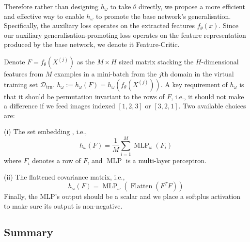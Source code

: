 \documentclass{article}
\newcommand{\modelname}{Feature-Critic}
\begin{document}
Therefore rather than designing $h_\omega$ to take $\theta$ directly, we propose a more efficient and effective way to enable $h_\omega$ to promote the base network's generalisation. Specifically, the auxiliary loss operates on the extracted features $f_\theta(x)$. Since our auxiliary generalisation-promoting loss operates on the feature representation produced by the base network, we denote it \modelname. 

Denote $F=f_\theta(X^{(j)})$ as the  $M\times H$ sized matrix stacking the $H$-dimensional features from $M$ examples in a mini-batch from the $j$th domain in the virtual training set  $\mathcal{D}_{\text{trn}}$. $h_\omega:=h_\omega(F)=h_\omega(f_\theta(X^{(j)}))$. A key requirement of $h_\omega$ is that it should be permutation invariant to the rows of $F$, i.e., it should not make a difference if we feed images indexed $[1,2,3]$ or $[3,2,1]$. Two available choices are:

(i) The set embedding \cite{NIPS2017_6931}, i.e.,
\begin{equation}
\label{eq:h1}
h_\omega(F)=\frac{1}{M}\sum_{i=1}^{M} \operatorname{MLP}_\omega(F_i)
\end{equation}
\noindent where $F_i$ denotes a row of $F$, and $\operatorname{MLP}$ is a multi-layer perceptron.

(ii) The flattened covariance matrix, i.e.,
\begin{equation}
\label{eq:h2}
h_\omega(F) = \operatorname{MLP}_\omega(\operatorname{Flatten}(F^T F))
\end{equation}
Finally, the MLP's output should be a scalar and we place a softplus activation to make sure its output is non-negative.

\subsection{Summary}
\end{document}
